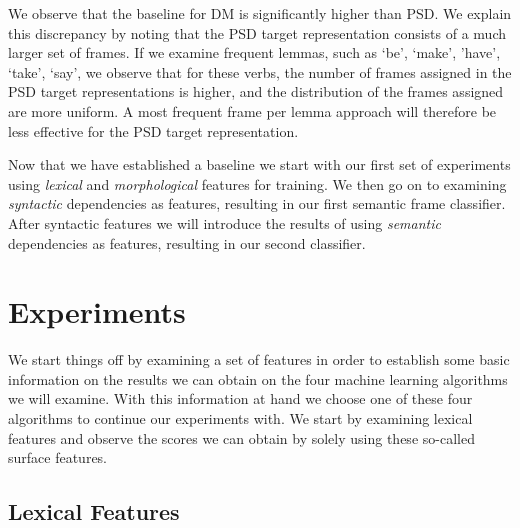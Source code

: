 We observe that the baseline for DM is significantly higher than PSD. We explain this discrepancy by noting that the PSD target representation consists of a much larger set of frames. If we examine frequent lemmas, such as `be', `make', 'have', `take', `say', we observe that for these verbs, the number of frames assigned in the PSD target representations is higher, and the distribution of the frames assigned are more uniform. A most frequent frame per lemma approach will therefore be less effective for the PSD target representation.

Now that we have established a baseline we start with our first set of experiments using \textit{lexical} and \textit{morphological} features for training. We then go on to examining \textit{syntactic} dependencies as features, resulting in our first semantic frame classifier. After syntactic features we will introduce the results of using \textit{semantic} dependencies as features, resulting in our second classifier.



\section{Experiments}

We start things off by examining a set of features in order to establish some basic information on the results we can obtain on the four machine learning algorithms we will examine. With this information at hand we choose one of these four algorithms to continue our experiments with. We start by examining lexical features and observe the scores we can obtain by solely using these so-called surface features. 




\subsection{Lexical Features}
\label{results_lex}


